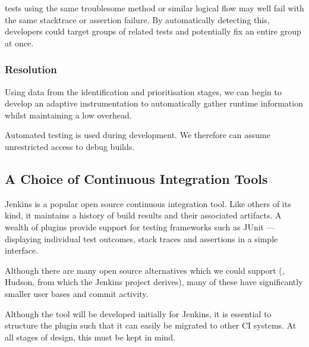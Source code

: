 \Flaky tests using the same troublesome method or similar logical flow may well
fail with the same stacktrace or assertion failure. By automatically detecting
this, developers could target groups of related tests and potentially fix an
entire group at once.

\subsubsection{Resolution}

Using data from the identification and prioritisation stages, we can begin to
develop an adaptive instrumentation to automatically gather runtime information
whilst maintaining a low overhead.

Automated testing is used during development. We therefore can assume
unrestricted access to debug builds.


\subsection{A Choice of Continuous Integration Tools}

Jenkins \cite{Jenkins} is a popular open source continuous integration tool.
Like others of its kind, it maintains a history of build results and their
associated artifacts. A wealth of plugins provide support for testing frameworks
such as JUnit --- displaying individual test outcomes, stack traces and
assertions in a simple interface.

Although there are many open source alternatives which we could support (\eg,
Hudson, from which the Jenkins project derives), many of these have
significantly smaller user bases and commit activity.

Although the tool will be developed initially for Jenkins, it is essential to
structure the plugin such that it can easily be migrated to other CI systems. At
all stages of design, this must be kept in mind.
